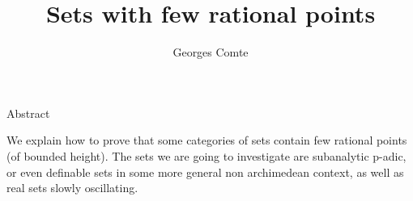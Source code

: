 \documentclass[a4paper,12pt]{article}
\begin{document}
\title{Sets with few rational points}
\author{Georges Comte}
\date{}
\maketitle

\begin{center}
{\Large Abstract}
\end{center}
We explain how to prove that some categories of sets contain few rational points (of bounded height). 
The sets we are going to investigate are subanalytic p-adic, or even definable sets in some more general non archimedean context, 
as well as real sets slowly oscillating.      
\end{document}
